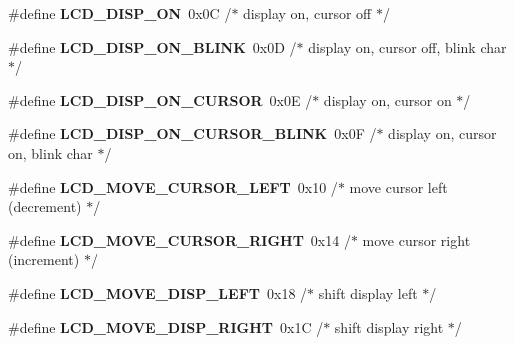 \begin{DoxyCompactItemize}
\item 
\mbox{\label{group__pfleury__lcd_ga5163a96b133868975c0738e180b30cb8}} 
\#define {\bfseries L\+C\+D\+\_\+\+D\+I\+S\+P\+\_\+\+ON}~0x0\+C /$\ast$ display on, cursor off                 $\ast$/
\item 
\mbox{\label{group__pfleury__lcd_ga470cef85de53e37356b22c66a357a764}} 
\#define {\bfseries L\+C\+D\+\_\+\+D\+I\+S\+P\+\_\+\+O\+N\+\_\+\+B\+L\+I\+NK}~0x0\+D /$\ast$ display on, cursor off, blink char     $\ast$/
\item 
\mbox{\label{group__pfleury__lcd_gaf56b6d6bdb6fa48b26106dee5f74ae1f}} 
\#define {\bfseries L\+C\+D\+\_\+\+D\+I\+S\+P\+\_\+\+O\+N\+\_\+\+C\+U\+R\+S\+OR}~0x0\+E /$\ast$ display on, cursor on                  $\ast$/
\item 
\mbox{\label{group__pfleury__lcd_gac1984ed0db15c6991d34c184fdca5dc6}} 
\#define {\bfseries L\+C\+D\+\_\+\+D\+I\+S\+P\+\_\+\+O\+N\+\_\+\+C\+U\+R\+S\+O\+R\+\_\+\+B\+L\+I\+NK}~0x0\+F /$\ast$ display on, cursor on, blink char      $\ast$/
\item 
\mbox{\label{group__pfleury__lcd_gac2f0ddce1daaa1bf1a016270a89a264b}} 
\#define {\bfseries L\+C\+D\+\_\+\+M\+O\+V\+E\+\_\+\+C\+U\+R\+S\+O\+R\+\_\+\+L\+E\+FT}~0x10 /$\ast$ move cursor left  (decrement)          $\ast$/
\item 
\mbox{\label{group__pfleury__lcd_ga0ad58e39e053e97d34527fcbe936899b}} 
\#define {\bfseries L\+C\+D\+\_\+\+M\+O\+V\+E\+\_\+\+C\+U\+R\+S\+O\+R\+\_\+\+R\+I\+G\+HT}~0x14 /$\ast$ move cursor right (increment)          $\ast$/
\item 
\mbox{\label{group__pfleury__lcd_gab3c34ff1eee238bbe9c677215219fb8e}} 
\#define {\bfseries L\+C\+D\+\_\+\+M\+O\+V\+E\+\_\+\+D\+I\+S\+P\+\_\+\+L\+E\+FT}~0x18 /$\ast$ shift display left                     $\ast$/
\item 
\mbox{\label{group__pfleury__lcd_ga9a90bb926f5ba59378af81fe8e246ffb}} 
\#define {\bfseries L\+C\+D\+\_\+\+M\+O\+V\+E\+\_\+\+D\+I\+S\+P\+\_\+\+R\+I\+G\+HT}~0x1\+C /$\ast$ shift display right                    $\ast$/

\end{DoxyCompactItemize}
